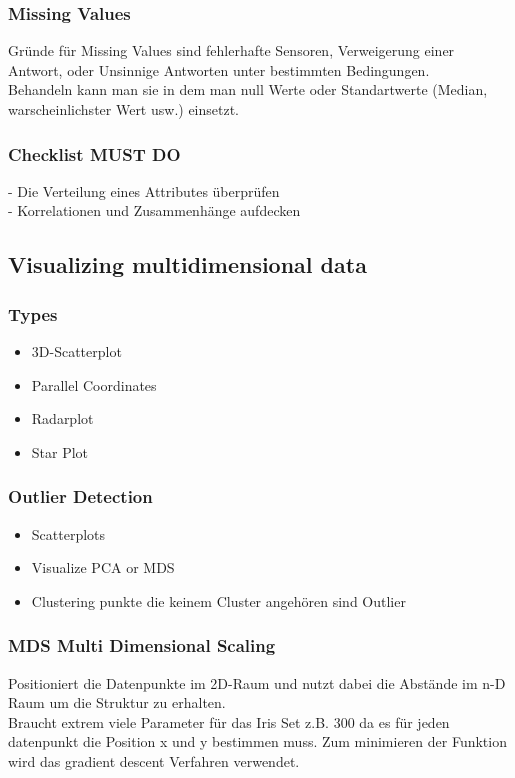 \documentclass[a4paper]{scrartcl}
\begin{document}
\subsubsection{Missing Values}
Gründe für Missing Values sind fehlerhafte Sensoren, Verweigerung einer Antwort, oder Unsinnige Antworten unter bestimmten Bedingungen.\\
Behandeln kann man sie in dem man null Werte oder Standartwerte (Median, warscheinlichster Wert usw.) einsetzt.
\subsubsection{Checklist MUST DO}
- Die Verteilung eines Attributes überprüfen\\
- Korrelationen und Zusammenhänge aufdecken\\

\subsection{Visualizing multidimensional data}
\subsubsection{Types}
\begin{itemize}
\item 3D-Scatterplot
\item Parallel Coordinates
\item Radarplot
\item Star Plot 
\end{itemize}
\subsubsection{Outlier Detection}
\begin{itemize}
\item Scatterplots
\item Visualize PCA or MDS
\item Clustering punkte die keinem Cluster angehören sind Outlier
\end{itemize}

\subsubsection{MDS Multi Dimensional Scaling}
Positioniert die Datenpunkte im 2D-Raum und nutzt dabei die Abstände im n-D Raum um die Struktur zu erhalten.\\
Braucht extrem viele Parameter für das Iris Set z.B. 300 da es für jeden datenpunkt die Position x und y bestimmen muss. Zum minimieren der Funktion wird das gradient descent Verfahren verwendet.
\end{document}
